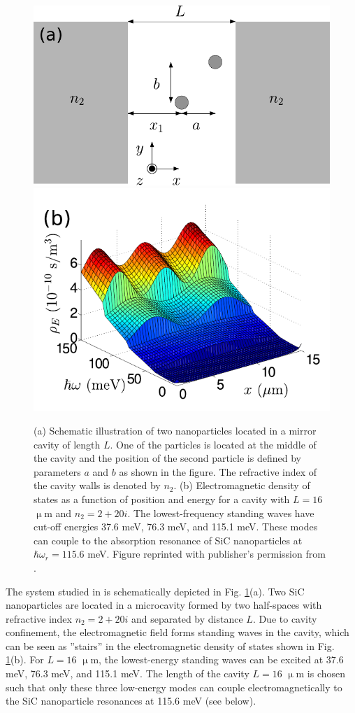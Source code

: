 \begin{figure}
 \includegraphics[width=.55\columnwidth]{pics/dipole_fig2.pdf}
 \includegraphics[width=.44\columnwidth]{pics/dipole_fig3a_mod.pdf}
 \caption{(a) Schematic illustration of two nanoparticles located in a mirror cavity of length $L$. One of the particles is located at the middle of the cavity and the position of the second particle is defined by parameters $a$ and $b$ as shown in the figure. The refractive index of the cavity walls is denoted by $n_2$. (b) Electromagnetic density of states as a function of position and energy for a cavity with $L=16$ $\upmu$m and $n_2=2+20i$. The lowest-frequency standing waves have cut-off energies 37.6 meV, 76.3 meV, and 115.1 meV. These modes can couple to the absorption resonance of SiC nanoparticles at $\hbar\omega_r=115.6$ meV. Figure reprinted with publisher's permission from .}
\label{fig:gfm_dipole_system}
\end{figure}

The system studied in  is schematically depicted in Fig. \ref{fig:gfm_dipole_system}(a). Two SiC nanoparticles are located in a microcavity formed by two half-spaces with refractive index $n_2=2+20i$ and separated by distance $L$. Due to cavity confinement, the electromagnetic field forms standing waves in the cavity, which can be seen as ''stairs'' in the electromagnetic density of states shown in Fig. \ref{fig:gfm_dipole_system}(b). For $L=16$ $\upmu$m, the lowest-energy standing waves can be excited at 37.6 meV, 76.3 meV, and 115.1 meV. The length of the cavity $L=16$ $\upmu$m is chosen such that only these three low-energy modes can couple electromagnetically to the SiC nanoparticle resonances at 115.6 meV (see below). 

